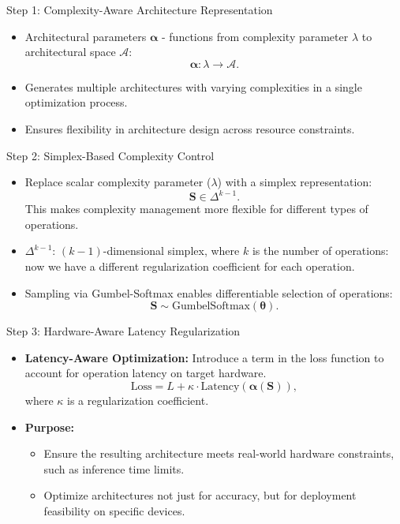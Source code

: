 \documentclass{beamer}
\begin{document}

\begin{frame}{Step 1: Complexity-Aware Architecture Representation}
\begin{itemize}
    \item Architectural parameters \(\boldsymbol{\alpha}\) - functions from complexity parameter \(\lambda\) to architectural space \(  \mathcal{A} \):
    \[
    \boldsymbol{\alpha}: \lambda \to \mathcal{A}.
    \]
    \item Generates multiple architectures with varying complexities in a single optimization process.
    \item Ensures flexibility in architecture design across resource constraints.
\end{itemize}
\end{frame}


\begin{frame}{Step 2: Simplex-Based Complexity Control}
\begin{itemize}
    \item Replace scalar complexity parameter (\(\lambda\)) with a simplex representation:
    \[
    \boldsymbol{S} \in \Delta^{k-1}.
    \]
    This makes complexity management more flexible for different types of operations.  
    \item \(\Delta^{k-1}\): \((k-1)\)-dimensional simplex, where \(k\) is the number of operations: now we have a different regularization coefficient for each operation.
    \item Sampling via Gumbel-Softmax enables differentiable selection of operations:
    \[
    \boldsymbol{S} \sim \text{GumbelSoftmax}(\boldsymbol{\theta}).
    \]
\end{itemize}
\end{frame}


\begin{frame}{Step 3: Hardware-Aware Latency Regularization}
\begin{itemize}
    \item \textbf{Latency-Aware Optimization:}  
    Introduce a term in the loss function to account for operation latency on target hardware.
    \[
    \text{Loss} = L + \kappa \cdot \text{Latency}(\boldsymbol{\alpha(S)}),
    \]
    where \(\kappa\) is a regularization coefficient.
    \item \textbf{Purpose:}  
    \begin{itemize}
        \item Ensure the resulting architecture meets real-world hardware constraints, such as inference time limits.
        \item Optimize architectures not just for accuracy, but for deployment feasibility on specific devices.
    \end{itemize}
\end{itemize}
\end{frame}
\end{document}
